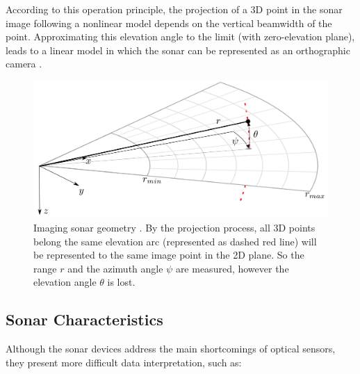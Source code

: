 \documentclass[final,5p,times]{elsarticle}
\begin{document}
According to this operation principle, the projection of a 3D point in the sonar image following a nonlinear model depends on the vertical beamwidth of the point. Approximating this elevation angle to the limit (with zero-elevation plane), leads to a linear model in which the sonar can be represented as an orthographic camera \cite{johannsson2010}.

\begin{figure}[h]
    \includegraphics[width=\columnwidth]{figs/sonar_geometry}
    \centering
    \captionsetup{justification=centering}
    \caption{Imaging sonar geometry \cite{huang2015}. By the projection process, all 3D points belong the same elevation arc (represented as dashed red line) will be represented to the same image point in the 2D plane. So the range $r$ and the azimuth angle $\psi$ are measured, however the elevation angle $\theta$ is lost.}
    \label{fig:sonar_geometry}
\end{figure}


\subsection{Sonar Characteristics}
\label{sonar:characteristics}

Although the sonar devices address the main shortcomings of optical sensors, they present more difficult data interpretation, such as:
\end{document}
